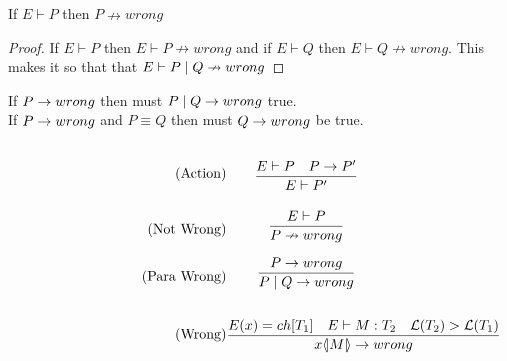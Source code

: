 \begin{theorem}
If \ensuremath{E\vdash P} then \ensuremath{P\nrightarrow wrong}

\begin{proof}
If \ensuremath{E \vdash P} then \ensuremath{E \vdash P \nrightarrow wrong} and if \ensuremath{E \vdash Q} then \ensuremath{E \vdash Q \nrightarrow wrong}. This makes it so that that \ensuremath{E \vdash P \para Q \nrightarrow wrong}
\end{proof}

\end{theorem}




If \ensuremath{P \ra wrong} then must \ensuremath{P \para Q \ra wrong} true.\\
If \ensuremath{P \ra wrong} and \ensuremath{P \equiv Q} then must \ensuremath{Q \ra wrong} be true.

\begin{align*}
    \tag{Action} & \infrule{E \vdash P \quad P\ra P'}{E\vdash P'}\\
    \tag{Not Wrong}& \infrule{E \vdash P}{P \nrightarrow wrong}\\
    \tag{Para Wrong}& \infrule{P \ra wrong}{P\para Q \ra wrong}\\
    \tag{Wrong}& \infrule{E(x) = ch[T_1] \quad E \vdash M:T_2 \quad \level{T_2} > \level{T_1} }{\lift{x}{M} \ra wrong}
\end{align*}


%
%

\FloatBarrier
